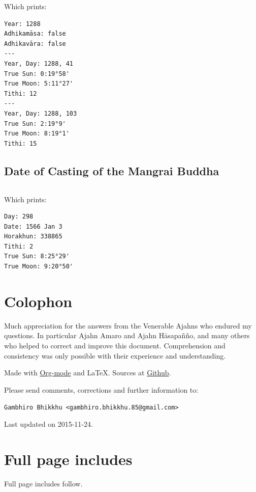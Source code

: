 \documentclass[11pt,oneside]{memoir-article}
\begin{document}
\inputminted{go}{./includes/print-1288.go}

\clearpage

Which prints:

\begin{verbatim}
Year: 1288
Adhikamāsa: false
Adhikavāra: false
---
Year, Day: 1288, 41
True Sun: 0:19°58'
True Moon: 5:11°27'
Tithi: 12
---
Year, Day: 1288, 103
True Sun: 2:19°9'
True Moon: 8:19°1'
Tithi: 15
\end{verbatim}

\section{Date of Casting of the Mangrai Buddha}
\label{sec-6-2}
\label{golang-mangrai}

\inputminted{go}{./includes/print-wat-kiat.go}

\bigskip

Which prints:

\begin{verbatim}
Day: 298
Date: 1566 Jan 3
Horakhun: 338865
Tithi: 2
True Sun: 8:25°29'
True Moon: 9:20°50'
\end{verbatim}

\clearpage

\backmatter

\chapter{Colophon}
\label{sec-7}

Much appreciation for the answers from the Venerable Ajahns who endured my
questions. In particular Ajahn Amaro and Ajahn Hāsapañño, and many others who
helped to correct and improve this document. Comprehension and consistency was
only possible with their experience and understanding.

Made with \href{http://orgmode.org/}{Org-mode} and \LaTeX. Sources at \href{https://github.com/profound-labs/calculating-the-uposatha-moondays/}{Github}.

Please send comments, corrections and further information to:

\texttt{Gambhiro Bhikkhu <gambhiro.bhikkhu.85@gmail.com>}

Last updated on 2015-11-24.

\clearpage

\printbibliography

\chapter{Full page includes}
\label{sec-8}

Full page includes follow.

\clearpage




\end{document}
